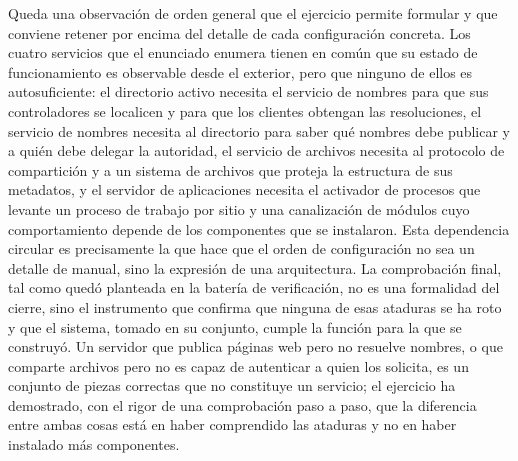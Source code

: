 \documentclass[12pt]{article}
\begin{document}
Queda una observación de orden general que el ejercicio permite formular y que conviene retener por encima del detalle de cada configuración concreta. Los cuatro servicios que el enunciado enumera tienen en común que su estado de funcionamiento es observable desde el exterior, pero que ninguno de ellos es autosuficiente: el directorio activo necesita el servicio de nombres para que sus controladores se localicen y para que los clientes obtengan las resoluciones, el servicio de nombres necesita al directorio para saber qué nombres debe publicar y a quién debe delegar la autoridad, el servicio de archivos necesita al protocolo de compartición y a un sistema de archivos que proteja la estructura de sus metadatos, y el servidor de aplicaciones necesita el activador de procesos que levante un proceso de trabajo por sitio y una canalización de módulos cuyo comportamiento depende de los componentes que se instalaron. Esta dependencia circular es precisamente la que hace que el orden de configuración no sea un detalle de manual, sino la expresión de una arquitectura. La comprobación final, tal como quedó planteada en la batería de verificación, no es una formalidad del cierre, sino el instrumento que confirma que ninguna de esas ataduras se ha roto y que el sistema, tomado en su conjunto, cumple la función para la que se construyó. Un servidor que publica páginas web pero no resuelve nombres, o que comparte archivos pero no es capaz de autenticar a quien los solicita, es un conjunto de piezas correctas que no constituye un servicio; el ejercicio ha demostrado, con el rigor de una comprobación paso a paso, que la diferencia entre ambas cosas está en haber comprendido las ataduras y no en haber instalado más componentes.

\nocite{*}
\printbibliography[heading=bibintoc, title={Referencias}]
\end{document}
